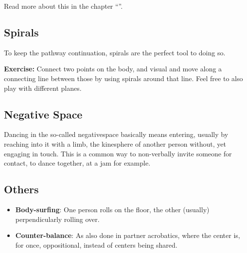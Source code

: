 Read more about this in the chapter ``''.

\subsection{Spirals}\label{subsec:spirals}

To keep the pathway continuation, spirals are the perfect tool to doing so.

\textbf{Exercise:} Connect two points on the body, and visual and move along a connecting line between those by using spirals around that line.
Feel free to also play with different planes.

\subsection{Negative Space}\label{subsec:negative-space}

Dancing in the so-called \gls{negativespace} basically means entering, usually by reaching into it with a limb, the \gls{kinesphere} of another person without, yet engaging in touch.
This is a common way to non-verbally invite someone for contact, to dance together, at a jam for example.

\subsection{Others}\label{subsec:others}

\begin{itemize}
    \item \textbf{Body-surfing}: One person rolls on the floor, the other (usually) perpendicularly rolling over.
    \item \textbf{Counter-balance}: As also done in partner acrobatics, where the center is, for once, oppositional, instead of centers being shared.
\end{itemize}